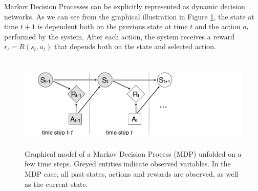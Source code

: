 Markov Decision Processes can be explicitly represented as dynamic decision networks.  As we can see from the graphical illustration in Figure \ref{fig:mdp}, the state at time $t+1$ is dependent both on the previous state at time $t$ and the action $a_t$ performed by the system. After each action, the system receives a reward $r_t = R(s_t, a_t)$ that depends both on the state and selected action. 

\begin{figure}[h]
$\phantom{d}$\hspace{20mm}
\includegraphics[scale=0.25]{imgs/MDP.pdf}
\caption{Graphical model of a Markov Decision Process (MDP) unfolded on a few time steps.  Greyed entities indicate observed variables. In the MDP case, all past states, actions and rewards are observed, as well as the current state.}
\label{fig:mdp}
\end{figure}


